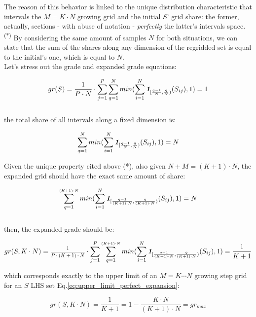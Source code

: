 \documentclass[12pt]{extarticle}
\newcommand{\meqref}[1]{Eq.\ref{#1}}
\newcommand{\indfunc}[1]{\textit{\textbf{1}}_{#1}}
\begin{document}
The reason of this behavior is linked to the unique distribution characteristic that intervals the $M = K \cdot N$ growing grid and the initial $S$' grid share: the former, actually, sections - with abuse of notation - \emph{perfectly} the latter's intervals space. \textsuperscript{(*)} By considering the same amount of samples $N$ for both situations, we can state that the sum of the shares along any dimension of the regridded set is equal to the initial's one, which is equal to $N$.\\
Let's stress out the grade and expanded grade equations:

\begin{equation*}
gr(S) = \frac{1}{P \cdot N} \cdot \sum^P_{j=1} \sum^N_{q=1} min(\sum^N_{i=1}\indfunc{[\frac{q-1}{N}, \frac{q}{N})}(S_{ij}), 1) = 1
\end{equation*}
\\
the total share of all intervals along a fixed dimension is:

\begin{equation*}
\sum^N_{q=1} min(\sum^N_{i=1}\indfunc{[\frac{q-1}{N}, \frac{q}{N})}(S_{ij}), 1) = N
\end{equation*}

Given the unique property cited above (*), also given $N + M = (K+1) \cdot N $, the expanded grid should have the exact same amount of share:

\begin{equation*}
\sum^{{\scriptscriptstyle (K+1) \cdot N}}_{q=1} min(\sum^{N}_{i=1}\indfunc{[\frac{q-1}{{(K+1) \cdot N}}, \frac{q}{(K+1) \cdot N})}(S_{ij}), 1) = N
\end{equation*}
\\
then, the expanded grade should be:

\begin{equation*}
gr(S, K \cdot N) = \text{\scalebox{0.75}{$\frac{1}{{P \cdot (K+1) \cdot N}}$}} \cdot \sum^P_{j=1}\sum^{{\scriptscriptstyle (K+1) \cdot N}}_{q=1} min(\sum^{N}_{i=1}\indfunc{[\frac{q-1}{{(K+1) \cdot N}}, \frac{q}{(K+1) \cdot N})}(S_{ij}), 1) = \frac{1}{K+1}
\end{equation*}

which corresponds exactly to the upper limit of an $M = K \cdots N$ growing step grid for an $S$ LHS set \meqref{eq:upper_limit_perfect_expansion}: 

\begin{equation*}
gr(S, K \cdot N) = \frac{1}{K+1} = 1 - \frac{K \cdot N}{(K+1) \cdot N} = gr_{max}
\end{equation*}
\end{document}
